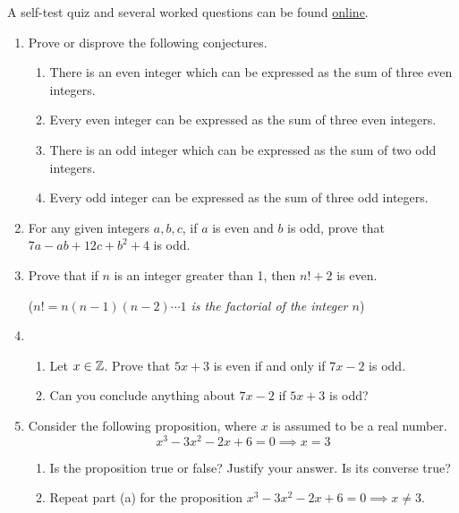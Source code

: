 \begin{exercises}{}{}
	A self-test quiz and several worked questions can be found \href{http://www.math.uci.edu/~ndonalds/math13/selftest/2-3-proofs.html}{online}.

	\begin{enumerate}
  	\item Prove or disprove the following conjectures.
		\begin{enumerate}
	  	\item There is an even integer which can be expressed as the sum of three even integers.
	  	\item Every even integer can be expressed as the sum of three even integers. 
	  	\item There is an odd integer which can be expressed as the sum of two odd integers.
	  	\item Every odd integer can be expressed as the sum of three odd integers.
		\end{enumerate}

	
		\item For any given integers $a,b,c$, if $a$ is even and $b$ is odd, prove that $7a-ab+12c+b^2+4$ is odd.
	

		\item Prove that if $n$ is an integer greater than 1, then $n!+2$ is even.\par
  (\emph{$n!=n(n-1)(n-2)\cdots 1$ is the \emph{factorial} of the integer $n$})
  
  
		\item\begin{enumerate}
		  \item Let $x\in\mathbb{Z}$. Prove that $5x+3$ is even if and only if $7x-2$ is odd.
		  \item Can you conclude anything about $7x-2$ if $5x+3$ is odd?
		\end{enumerate}
		
  
  	\item Consider the following proposition, where $x$ is assumed to be a real number.
		\[
			x^3-3x^2-2x+6=0\implies x=3
		\]
		\begin{enumerate}
	  	\item Is the proposition true or false? Justify your answer. Is its converse true?
	  	\item Repeat part (a) for the proposition $x^3-3x^2-2x+6=0\implies x\neq 3$.
		\end{enumerate}
		

\end{enumerate}
\end{exercises}
